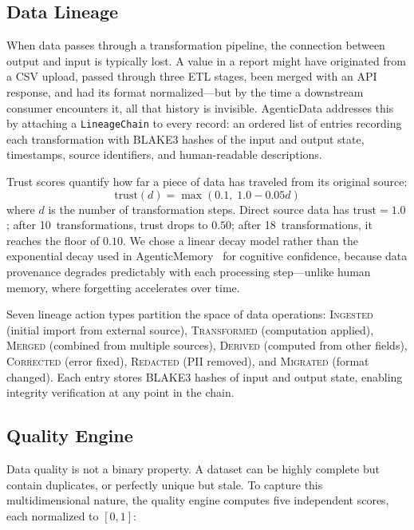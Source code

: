 \documentclass[10pt, twocolumn]{article}
\begin{document}
\subsection{Data Lineage}\label{sec:lineage}

When data passes through a transformation pipeline, the connection between output and input is typically lost. A value in a report might have originated from a CSV upload, passed through three ETL stages, been merged with an API response, and had its format normalized---but by the time a downstream consumer encounters it, all that history is invisible. AgenticData addresses this by attaching a \texttt{LineageChain} to every record: an ordered list of entries recording each transformation with BLAKE3 hashes of the input and output state, timestamps, source identifiers, and human-readable descriptions.

Trust scores quantify how far a piece of data has traveled from its original source:
\begin{equation}
\text{trust}(d) = \max\left(0.1,\; 1.0 - 0.05d\right)
\label{eq:trust}
\end{equation}
where $d$ is the number of transformation steps. Direct source data has $\text{trust} = 1.0$; after 10~transformations, trust drops to $0.50$; after 18~transformations, it reaches the floor of $0.10$. We chose a linear decay model rather than the exponential decay used in AgenticMemory~\cite{owolabi2026agenticmemory} for cognitive confidence, because data provenance degrades predictably with each processing step---unlike human memory, where forgetting accelerates over time.

Seven lineage action types partition the space of data operations: \textsc{Ingested} (initial import from external source), \textsc{Transformed} (computation applied), \textsc{Merged} (combined from multiple sources), \textsc{Derived} (computed from other fields), \textsc{Corrected} (error fixed), \textsc{Redacted} (PII removed), and \textsc{Migrated} (format changed). Each entry stores BLAKE3 hashes of input and output state, enabling integrity verification at any point in the chain.

\subsection{Quality Engine}\label{sec:quality}

Data quality is not a binary property. A dataset can be highly complete but contain duplicates, or perfectly unique but stale. To capture this multidimensional nature, the quality engine computes five independent scores, each normalized to $[0, 1]$:
\end{document}
